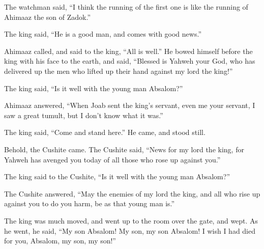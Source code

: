 {\par }{\PP {}The watchman said, “I think the running of the first one is like the running of Ahimaaz the son of Zadok.”
\par }{\PP The king said, “He is a good man, and comes with good news.”
\par }{\PP {}Ahimaaz called, and said to the king, “All is well.” He bowed himself before the king with his face to the earth, and said, “Blessed is Yahweh your God, who has delivered up the men who lifted up their hand against my lord the king!”
\par }{\PP {}The king said, “Is it well with the young man Absalom?”
\par }{\PP Ahimaaz answered, “When Joab sent the king’s servant, even me your servant, I saw a great tumult, but I don’t know what it was.”
\par }{\PP {}The king said, “Come and stand here.” He came, and stood still.
\par }{\PP {}Behold, the Cushite came. The Cushite said, “News for my lord the king, for Yahweh has avenged you today of all those who rose up against you.”
\par }{\PP {}The king said to the Cushite, “Is it well with the young man Absalom?”
\par }{\PP The Cushite answered, “May the enemies of my lord the king, and all who rise up against you to do you harm, be as that young man is.”
\par }{\PP {}The king was much moved, and went up to the room over the gate, and wept. As he went, he said, “My son Absalom! My son, my son Absalom! I wish I had died for you, Absalom, my son, my son!”

}
